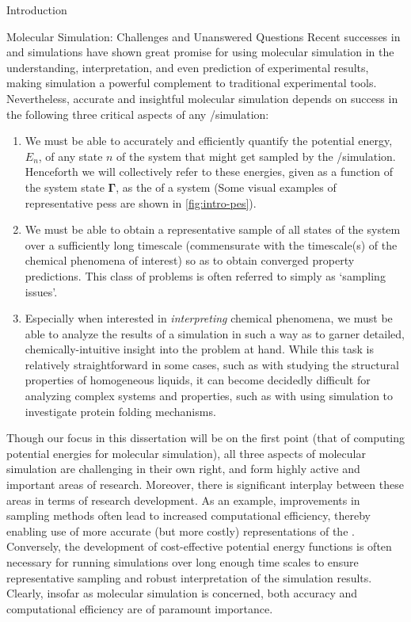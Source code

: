 \begin{chapter}{Introduction}
\begin{section}{Molecular Simulation: Challenges and Unanswered Questions}
Recent successes in \md and \mc simulations
have shown great promise for using molecular simulation in the understanding,
interpretation, and even prediction of experimental
results,\cite{VanGunsteren1990}
making simulation a powerful complement to traditional experimental tools.
\cite{Hospital2015,Karplus2002,Bereau2016,Chen2015,Maurin2016,Jiang2011,Schneider2005,Jorgensen2004}
Nevertheless, accurate and insightful molecular simulation
depends on success in the following three critical aspects of any \md/\mc simulation:
%
\begin{enumerate}
\item We must be able to accurately and efficiently quantify the potential
energy, $E_n$, of any state $n$ of the system that might get sampled by the
\md/\mc simulation. 
\cite{Ballone2014,Lopes2015,Saunders2013,DeCarvalho2014}
Henceforth we will collectively refer to these energies, given as a function
of the system state $\bm \Gamma$, as the \pes of a system (Some visual
examples of representative \glspl{pes} are shown in \cref{fig:intro-pes}).
\item We must be able to obtain a representative sample of all states of the system over a sufficiently long timescale
(commensurate with the timescale(s) of the chemical phenomena of interest) so as
to obtain converged property predictions.
\cite{Lei2007,Grossfield2010,Theodorou2010}
This class of problems is often referred to simply as `sampling issues'.
\item Especially when interested in \emph{interpreting} chemical phenomena, we must be
able to analyze the results of a simulation in such a way as to garner
detailed, chemically-intuitive insight into the problem at hand.
\cite{E2010,Pande2010,Rohrdanz2013}
While this task is relatively straightforward in some cases, such as with
studying the structural properties of homogeneous liquids,
it can become decidedly
difficult for analyzing complex systems and properties, such as with using
simulation to investigate protein folding mechanisms.
\end{enumerate}
Though our focus in this dissertation will be on the first point (that of
computing potential energies for molecular simulation), all three 
aspects of molecular simulation are challenging in their own right, and form
highly active and important areas of research. 
\cite{Ciccotti2014} 
Moreover, there is significant interplay between these areas in terms of
research development.
As an example, improvements in sampling methods often lead to increased computational
efficiency, thereby enabling use of more accurate (but more costly)
representations of the \pes. Conversely, the development of
cost-effective potential energy functions is often necessary for
running simulations over long enough time scales to ensure representative
sampling and robust interpretation of the simulation results. Clearly, insofar
as molecular simulation is concerned, both
accuracy and computational efficiency are of paramount importance. 


\end{section}
\end{chapter}
